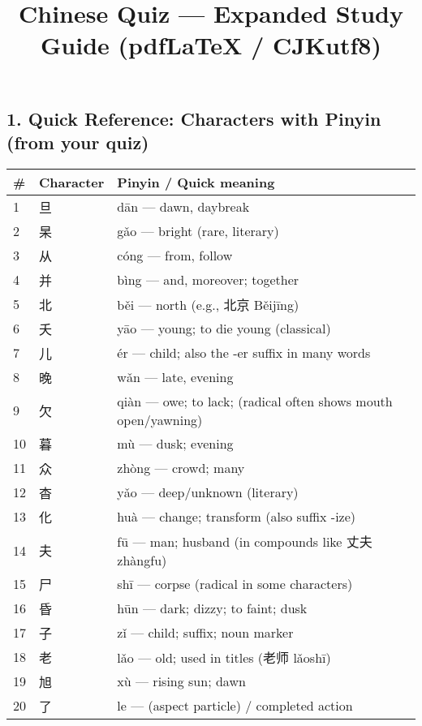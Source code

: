 \documentclass[12pt]{article}
\title{Chinese Quiz — Expanded Study Guide (pdfLaTeX / CJKutf8)}
\author{}
\date{}
\begin{document}
\maketitle

\begin{CJK}{UTF8}{gbsn}

\section*{1. Quick Reference: Characters with Pinyin (from your quiz)}
\begin{longtable}{lll}
\toprule
\# & Character & Pinyin / Quick meaning \\
\midrule
1 & 旦 & dān — dawn, daybreak \\
2 & 杲 & gǎo — bright (rare, literary) \\
3 & 从 & cóng — from, follow \\
4 & 并 & bìng — and, moreover; together \\
5 & 北 & běi — north (e.g., 北京 Běijīng) \\
6 & 夭 & yāo — young; to die young (classical) \\
7 & 儿 & ér — child; also the -er suffix in many words \\
8 & 晚 & wǎn — late, evening \\
9 & 欠 & qiàn — owe; to lack; (radical often shows mouth open/yawning) \\
10 & 暮 & mù — dusk; evening \\
11 & 众 & zhòng — crowd; many \\
12 & 杳 & yǎo — deep/unknown (literary) \\
13 & 化 & huà — change; transform (also suffix -ize) \\
14 & 夫 & fū — man; husband (in compounds like 丈夫 zhàngfu) \\
15 & 尸 & shī — corpse (radical in some characters) \\
16 & 昏 & hūn — dark; dizzy; to faint; dusk \\
17 & 子 & zǐ — child; suffix; noun marker \\
18 & 老 & lǎo — old; used in titles (老师 lǎoshī) \\
19 & 旭 & xù — rising sun; dawn \\
20 & 了 & le — (aspect particle) / completed action \\

\end{longtable}
\end{CJK}
\end{document}
